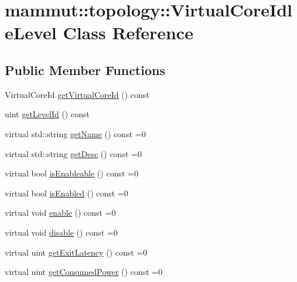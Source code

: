 \hypertarget{classmammut_1_1topology_1_1VirtualCoreIdleLevel}{\section{mammut\-:\-:topology\-:\-:Virtual\-Core\-Idle\-Level Class Reference}
\label{classmammut_1_1topology_1_1VirtualCoreIdleLevel}
}
\subsection*{Public Member Functions}
\begin{DoxyCompactItemize}
\item 
Virtual\-Core\-Id \hyperlink{classmammut_1_1topology_1_1VirtualCoreIdleLevel_a1145d3ff6d9052589afc4b308896e789}{get\-Virtual\-Core\-Id} () const 
\item 
uint \hyperlink{classmammut_1_1topology_1_1VirtualCoreIdleLevel_a0b3c6dc7b77dedb33753c751f59b3b42}{get\-Level\-Id} () const 
\item 
virtual std\-::string \hyperlink{classmammut_1_1topology_1_1VirtualCoreIdleLevel_a0e11b685cd38c09e4e6fd7610670ffd5}{get\-Name} () const =0
\item 
virtual std\-::string \hyperlink{classmammut_1_1topology_1_1VirtualCoreIdleLevel_af2542933dbfe7e83ff9c522a43d96d45}{get\-Desc} () const =0
\item 
virtual bool \hyperlink{classmammut_1_1topology_1_1VirtualCoreIdleLevel_afac261b8838df4df7f694dab365643d2}{is\-Enableable} () const =0
\item 
virtual bool \hyperlink{classmammut_1_1topology_1_1VirtualCoreIdleLevel_acabc887668492f3e085aae5bb905558a}{is\-Enabled} () const =0
\item 
virtual void \hyperlink{classmammut_1_1topology_1_1VirtualCoreIdleLevel_aac5bccbd57ef3246ac6c268204a337ab}{enable} () const =0
\item 
virtual void \hyperlink{classmammut_1_1topology_1_1VirtualCoreIdleLevel_a25ce6958cae064d55055c7940d236f9d}{disable} () const =0
\item 
virtual uint \hyperlink{classmammut_1_1topology_1_1VirtualCoreIdleLevel_ab4ab28cce2c5b0d46b94cb0bae02bba5}{get\-Exit\-Latency} () const =0
\item 
virtual uint \hyperlink{classmammut_1_1topology_1_1VirtualCoreIdleLevel_a0be5f6e317cbfeb8825a21f13ae3e78d}{get\-Consumed\-Power} () const =0
\item 

\end{DoxyCompactItemize}
